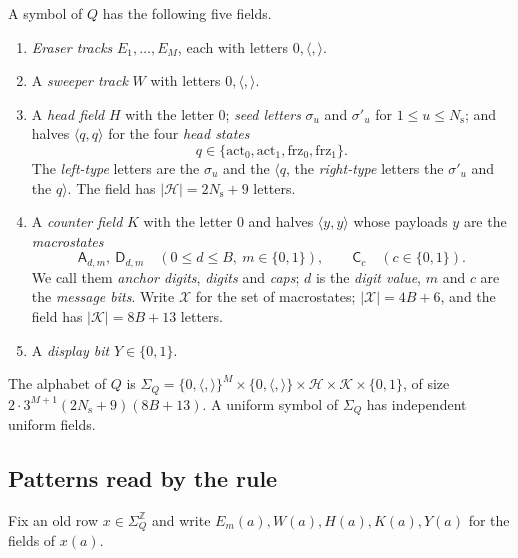 \documentclass[11pt]{article}
\theoremstyle{plain}
\theoremstyle{definition}
\theoremstyle{remark}
\newcommand{\Z}{\mathbb Z}
\newcommand{\Lh}[1]{\langle #1}
\newcommand{\Rh}[1]{#1\rangle}
\newcommand{\mA}{\mathsf A}
\newcommand{\mD}{\mathsf D}
\newcommand{\mC}{\mathsf C}
\newcommand{\act}{\mathrm{act}}
\newcommand{\frz}{\mathrm{frz}}
\newcommand{\SigQ}{\Sigma_Q}
\newcommand{\Hs}{\mathcal H}
\newcommand{\Ks}{\mathcal K}
\newcommand{\Xs}{\mathcal X}
\begin{document}
A symbol of $Q$ has the following five fields.
\begin{enumerate}[label=(\arabic*)]
\item \emph{Eraser tracks} $E_1,\dots,E_M$, each with letters $0,\langle,\rangle$.
\item A \emph{sweeper track} $W$ with letters $0,\langle,\rangle$.
\item A \emph{head field} $H$ with the letter $0$; \emph{seed letters} $\sigma_u$ and $\sigma'_u$ for $1\le u\le N_{\mathrm s}$; and halves $\Lh q,\Rh q$ for the four \emph{head states}
\[
q\in\{\act_0,\act_1,\frz_0,\frz_1\}.
\]
The \emph{left-type} letters are the $\sigma_u$ and the $\Lh q$, the \emph{right-type} letters the $\sigma'_u$ and the $\Rh q$. The field has $|\Hs|=2N_{\mathrm s}+9$ letters.
\item A \emph{counter field} $K$ with the letter $0$ and halves $\Lh y,\Rh y$ whose payloads $y$ are the \emph{macrostates}
\[
\mA_{d,m},\ \mD_{d,m}\quad(0\le d\le B,\ m\in\{0,1\}),\qquad \mC_c\quad(c\in\{0,1\}).
\]
We call them \emph{anchor digits}, \emph{digits} and \emph{caps}; $d$ is the \emph{digit value}, $m$ and $c$ are the \emph{message bits}. Write $\Xs$ for the set of macrostates; $|\Xs|=4B+6$, and the field has $|\Ks|=8B+13$ letters.
\item A \emph{display bit} $Y\in\{0,1\}$.
\end{enumerate}
The alphabet of $Q$ is $\SigQ=\{0,\langle,\rangle\}^M\times\{0,\langle,\rangle\}\times\Hs\times\Ks\times\{0,1\}$, of size $2\cdot3^{M+1}(2N_{\mathrm s}+9)(8B+13)$. A uniform symbol of $\SigQ$ has independent uniform fields.

\subsection{Patterns read by the rule}

Fix an old row $x\in\SigQ^\Z$ and write $E_m(a),W(a),H(a),K(a),Y(a)$ for the fields of $x(a)$.
\end{document}
